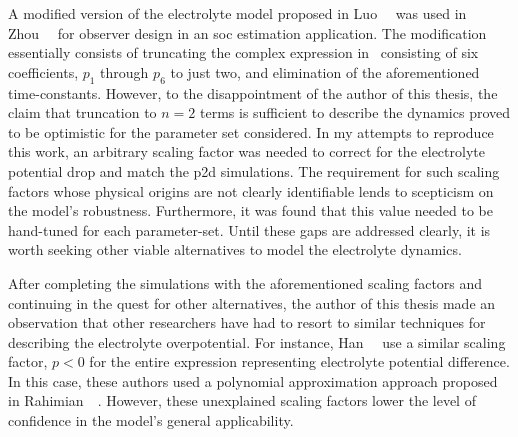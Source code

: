 A modified version of the electrolyte model proposed in Luo~\etal~\cite{Luo2013}
was  used  in Zhou~\etal~\cite{Zou2016}  for  observer  design in  an  \gls{soc}
estimation application. The modification  essentially consists of truncating the
complex  expression  in~\cite{Luo2013}  consisting of  six  coefficients,  $p_1$
through $p_6$ to just two, and elimination of the aforementioned time-constants.
However, to  the disappointment  of the  author of this  thesis, the  claim that
truncation to  $n=2$ terms is sufficient  to describe the dynamics  proved to be
optimistic for  the parameter set considered.  In my attempts to  reproduce this
work, an  arbitrary scaling  factor was  needed to  correct for  the electrolyte
potential drop  and match  the \gls{p2d} simulations.  The requirement  for such
scaling factors  whose physical  origins are not  clearly identifiable  lends to
scepticism on the model's robustness. Furthermore,  it was found that this value
needed to be  hand-tuned for each parameter-set. Until these  gaps are addressed
clearly, it is worth seeking other  viable alternatives to model the electrolyte
dynamics.

After  completing  the  simulations  with  the  aforementioned  scaling  factors
and  continuing  in  the  quest  for other  alternatives,  the  author  of  this
thesis  made  an   observation  that  other  researchers  have   had  to  resort
to  similar  techniques  for   describing  the  electrolyte  overpotential.  For
instance,  Han~\etal~\cite{Han2015a} use  a  similar scaling  factor, $p<0$  for
the  entire expression  representing electrolyte  potential difference.  In this
case,  these  authors  used  a polynomial  approximation  approach  proposed  in
Rahimian~\etal~\cite{KhaleghiRahimian2013}.  However, these  unexplained scaling
factors lower the level of confidence in the model's general applicability.


